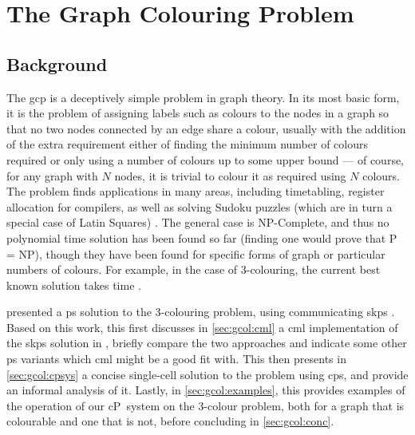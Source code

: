 \newcommand{\bo}{\(b\)}

\chapter{\label{chap:gcol}The Graph Colouring Problem}

\section{\label{sec:gcol:background}Background}

The \gls{gcp} is a deceptively simple problem in graph theory.  In its most basic form, it is the problem of assigning labels such as colours to the nodes in a graph so that no two nodes connected by an edge share a colour, usually with the addition of the extra requirement either of finding the minimum number of colours required or only using a number of colours up to some upper bound --- of course, for any graph with \(N\) nodes, it is trivial to colour it as required using \(N\) colours.  The problem finds applications in many areas, including timetabling, register allocation for compilers, as well as solving Sudoku puzzles (which are in turn a special case of Latin Squares) \cite{Lewis2016}.  The general case is NP-Complete, and thus no polynomial time solution has been found so far (finding one would prove that P = NP), though they have been found for specific forms of graph or particular numbers of colours.  For example, in the case of 3-colouring, the current best known solution takes  time \cite{Beigel2005}.

\citeauthor{Gheorghe2013} presented a \gls{ps} solution to the 3-colouring problem, using communicating \gls{skps} \cite{Gheorghe2013}.  Based on this work, this  first discusses in \cref{sec:gcol:cml} a \gls{cml} implementation of the \gls{skps} solution in \cite{Gheorghe2013}, briefly compare the two approaches and indicate some other \gls{ps} variants which \gls{cml} might be a good fit with.  This  then presents in \cref{sec:gcol:cpsys} a concise single-cell solution to the problem using \gls{cps}, and provide an informal analysis of it.  Lastly, in \cref{sec:gcol:examples}, this  provides examples of the operation of our cP~system on the 3-colour problem, both for a graph that is colourable and one that is not, before concluding in \cref{sec:gcol:conc}.





